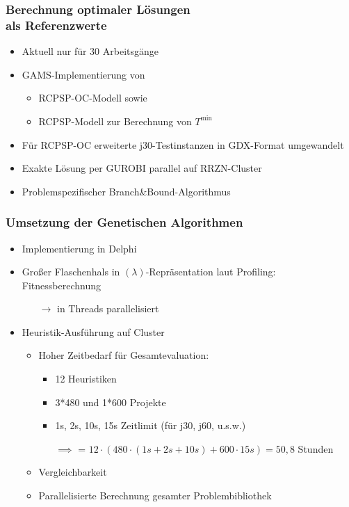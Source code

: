 \begin{frame}
\frametitle{Berechnung optimaler Lösungen\\als Referenzwerte}
\begin{itemize}
\item Aktuell nur für 30 Arbeitsgänge\\[4mm]
\item GAMS-Implementierung von
	\begin{itemize}
	\item RCPSP-OC-Modell sowie
	\item RCPSP-Modell zur Berechnung von $T^{\mbox{min}}$\\[4mm]
	\end{itemize}
\item Für RCPSP-OC erweiterte j30-Testinstanzen in GDX-Format umgewandelt
\item Exakte Lösung per GUROBI parallel auf RRZN-Cluster
\item Problemspezifischer Branch\&Bound-Algorithmus
\end{itemize}
\end{frame}

\begin{frame}
\frametitle{Umsetzung der Genetischen Algorithmen}
\begin{itemize}
\item Implementierung in Delphi\\[4mm]
\item Großer Flaschenhals in $(\lambda)$-Repräsentation laut Profiling: Fitnessberechnung 
\begin{itemize}\item[$\rightarrow$] in Threads parallelisiert\\[4mm]\end{itemize}
\item Heuristik-Ausführung auf Cluster
\begin{itemize}
	\item Hoher Zeitbedarf für Gesamtevaluation:
		\begin{itemize}
		\item 12 Heuristiken
		\item 3*480 und 1*600 Projekte
		\item 1s, 2s, 10s, 15s Zeitlimit (für j30, j60, u.s.w.)
		\item[$\implies$] = $12 \cdot (480\cdot (1s + 2s + 10s) + 600\cdot15s ) = 50{,}8$ Stunden
		\end{itemize}
	\item Vergleichbarkeit
	\item Parallelisierte Berechnung gesamter Problembibliothek
\end{itemize}
\end{itemize}
\end{frame}

